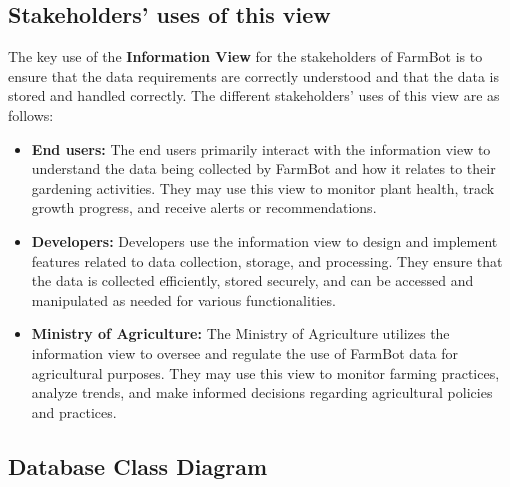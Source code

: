 
\subsection{Stakeholders’ uses of this view}

The key use of the \textbf{Information View} for the stakeholders of FarmBot is to ensure that the data requirements are correctly understood and that the data is stored and handled correctly. The different stakeholders' uses of this view are as follows:
\begin{itemize}
    \item \textbf{End users:} The end users primarily interact with the information view to understand the data being collected by FarmBot and how it relates to their gardening activities. They may use this view to monitor plant health, track growth progress, and receive alerts or recommendations.
    \item \textbf{Developers:} Developers use the information view to design and implement features related to data collection, storage, and processing. They ensure that the data is collected efficiently, stored securely, and can be accessed and manipulated as needed for various functionalities.
    \item \textbf{Ministry of Agriculture:} The Ministry of Agriculture utilizes the information view to oversee and regulate the use of FarmBot data for agricultural purposes. They may use this view to monitor farming practices, analyze trends, and make informed decisions regarding agricultural policies and practices.
    \end{itemize}
\subsection{Database Class Diagram}

